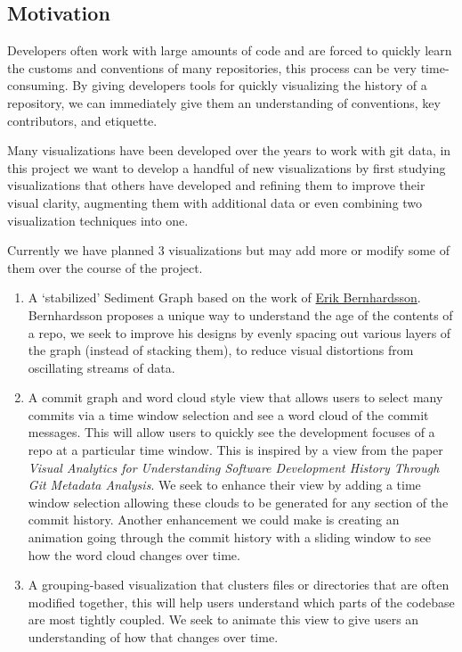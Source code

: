 \documentclass[12 pt]{article}
\begin{document}
\subsection{Motivation}
Developers often work with large amounts of code and are forced to quickly learn
the customs and conventions of many repositories, this process can be very
time-consuming. By giving developers tools for quickly visualizing the history
of a repository, we can immediately give them an understanding of conventions, key
contributors, and etiquette. \par
Many visualizations have been developed over the years to work with git data,
in this project we want to develop a handful of new visualizations by first
studying visualizations that others have developed and refining them to improve
their visual clarity, augmenting them with additional data or even combining two
visualization techniques into one. \par
Currently we have planned 3 visualizations but may add more or modify some of
them over the course of the project.
\begin{enumerate}
    \item A `stabilized' Sediment Graph based on the work of
        \href{https://github.com/erikbern/git-of-theseus}{Erik Bernhardsson}.
        Bernhardsson proposes a unique way to understand the age of the contents of a
        repo, we seek to improve his designs by evenly spacing out various
        layers of the graph (instead of stacking them), to reduce visual
        distortions from oscillating streams of data.
    \item A commit graph and word cloud style view that allows users to select
        many commits via a time window selection and see a word cloud of
        the commit messages. This will allow users to quickly see the
        development focuses of a repo at a particular time window. This is
        inspired by a view from the paper \textit{Visual Analytics for Understanding Software Development History Through
        Git Metadata Analysis}. We seek to enhance their view by adding a time
        window selection allowing these clouds to be generated for any section
        of the commit history. Another enhancement we could make is creating an
        animation going through the commit history with a sliding window to see how the word
        cloud changes over time.
    \item A grouping-based visualization that clusters files or directories that
        are often modified together, this will help users understand which parts
        of the codebase are most tightly coupled. We seek to animate this view
        to give users an understanding of how that changes over time.
\end{enumerate}
\end{document}
